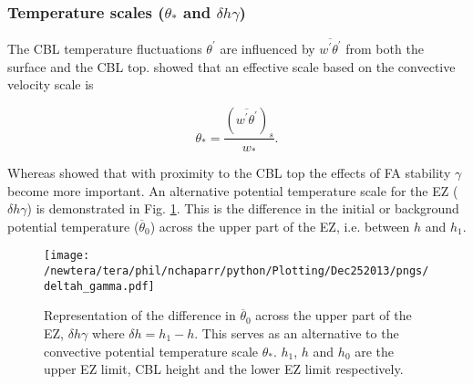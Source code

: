 


\subsubsection{Temperature scales ($\theta_{*}$ and $\delta h \gamma$)}
\label{subsubsec:tempscales}

The CBL temperature fluctuations $\theta^{'}$ are influenced by $\overline{w^{'}\theta^{'}}$ from both the surface and the CBL top.
\cite{Deardorff70} showed that an effective scale based on the convective velocity scale is

\begin{equation}
\theta_{*} = \frac{(\overline{w^{'}\theta^{'}})_{s}}{w_{*}}.
\end{equation} 

Whereas \cite{Sorbjan1} showed that with proximity to the CBL top the effects of FA stability $\gamma$ become more important.  An alternative potential temperature scale for the EZ ($\delta h \gamma$) is demonstrated in Fig. \ref{fig:deltahgamma}. This is the difference in the initial or background potential temperature ($\overline{\theta}_{0}$) across the upper part of the EZ, i.e. between $h$ and $h_{1}$.      

\begin{figure}[htbp]
    \centering
    \texttt{[image: /newtera/tera/phil/nchaparr/python/Plotting/Dec252013/pngs/deltah\_gamma.pdf]}
    \caption[Alternative Potential Temperature Scale for the EZ]{Representation of the difference in $\overline{\theta}_{0}$ across the upper part of the EZ, $\delta h \gamma$ where $\delta h = h_{1} - h$. This serves as an alternative to the convective potential temperature scale $\theta_{*}$. $h_{1}$, $h$ and $h_{0}$ are the upper EZ limit, CBL height and the lower EZ limit respectively.}
    \label{fig:deltahgamma}   %
\end{figure}

